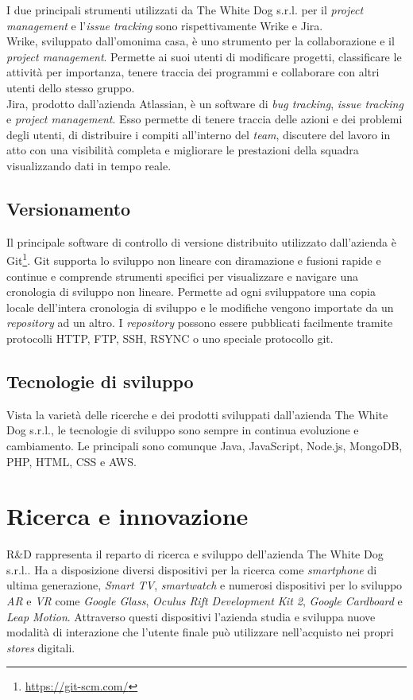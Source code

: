 I due principali strumenti utilizzati da The White Dog s.r.l. per il \textit{project management} e l'\textit{issue tracking} sono rispettivamente Wrike e Jira.\\
Wrike, sviluppato dall'omonima casa, è uno strumento per la collaborazione e il \textit{project management}. Permette ai suoi utenti di modificare progetti, classificare le attività per importanza, tenere traccia dei programmi e collaborare con altri utenti dello stesso gruppo.\\
Jira, prodotto dall'azienda Atlassian, è un software di \textit{bug tracking}, \textit{issue tracking} e \textit{project management}. Esso permette di tenere traccia delle azioni e dei problemi degli utenti, di distribuire i compiti all'interno del \textit{team}, discutere del lavoro in atto con una visibilità completa e migliorare le prestazioni della squadra visualizzando dati in tempo reale.

\subsection{Versionamento}

Il principale software di controllo di versione distribuito utilizzato dall'azienda è Git\footnote[6]{\url{https://git-scm.com/}}. Git supporta lo sviluppo non lineare con diramazione e fusioni rapide e continue e comprende strumenti specifici per visualizzare e navigare una cronologia di sviluppo non lineare. Permette ad ogni sviluppatore una copia locale dell'intera cronologia di sviluppo e le modifiche vengono importate da un \textit{repository} ad un altro. I \textit{repository} possono essere pubblicati facilmente tramite protocolli HTTP, FTP, SSH, RSYNC o uno speciale protocollo git.

\subsection{Tecnologie di sviluppo}

Vista la varietà delle ricerche e dei prodotti sviluppati dall'azienda The White Dog s.r.l., le tecnologie di sviluppo sono sempre in continua evoluzione e cambiamento. Le principali sono comunque Java, JavaScript, Node.js, MongoDB, PHP, HTML, CSS e AWS.

\section{Ricerca e innovazione}

R\&D rappresenta il reparto di ricerca e sviluppo dell'azienda The White Dog s.r.l..
Ha a disposizione diversi dispositivi per la ricerca come \textit{smartphone} di ultima generazione, \textit{Smart TV}, \textit{smartwatch} e numerosi dispositivi per lo sviluppo \textit{AR} e \textit{VR} come \textit{Google Glass}, \textit{Oculus Rift Development Kit 2}, \textit{Google Cardboard} e \textit{Leap Motion}. Attraverso questi dispositivi l'azienda studia e sviluppa nuove modalità di interazione che l'utente finale può utilizzare nell'acquisto nei propri \textit{stores} digitali.
